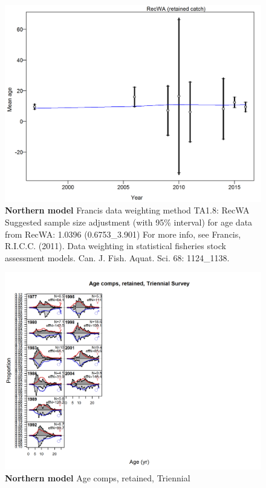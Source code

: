 \documentclass[12pt,]{article}
\begin{document}
\begin{figure}[htbp]
\centering
\includegraphics{./r4ss/plots_mod1/comp_agefit_data_weighting_TA1.8_RecWA.png}
\caption{\textbf{Northern model} Francis data weighting method TA1.8:
RecWA Suggested sample size adjustment (with 95\% interval) for age data
from RecWA: 1.0396 (0.6753\_3.901) For more info, see Francis, R.I.C.C.
(2011). Data weighting in statistical fisheries stock assessment models.
Can. J. Fish. Aquat. Sci. 68: 1124\_1138.
\label{fig:mod1_9_comp_agefit_data_weighting_TA1.8_RecWA}}
\end{figure}

\begin{figure}[htbp]
\centering
\includegraphics{./r4ss/plots_mod1/comp_agefit_flt5mkt2.png}
\caption{\textbf{Northern model} Age comps, retained, Triennial
\label{fig:mod1_10_comp_agefit_flt5mkt2}}
\end{figure}
\end{document}
